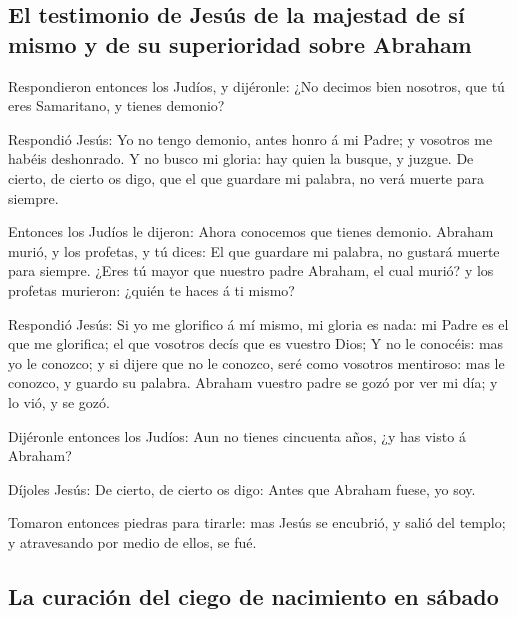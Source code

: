 \hypertarget{el-testimonio-de-jesuxfas-de-la-majestad-de-suxed-mismo-y-de-su-superioridad-sobre-abraham}{%
\subsection{El testimonio de Jesús de la majestad de sí mismo y de su
superioridad sobre
Abraham}\label{el-testimonio-de-jesuxfas-de-la-majestad-de-suxed-mismo-y-de-su-superioridad-sobre-abraham}}

 Respondieron entonces los Judíos, y dijéronle: ¿No
decimos bien nosotros, que tú eres Samaritano, y tienes demonio?

 Respondió Jesús: Yo no tengo demonio, antes honro á mi
Padre; y vosotros me habéis deshonrado.  Y no busco mi
gloria: hay quien la busque, y juzgue.  De cierto, de
cierto os digo, que el que guardare mi palabra, no verá muerte para
siempre.

 Entonces los Judíos le dijeron: Ahora conocemos que
tienes demonio. Abraham murió, y los profetas, y tú dices: El que
guardare mi palabra, no gustará muerte para siempre. 
¿Eres tú mayor que nuestro padre Abraham, el cual murió? y los profetas
murieron: ¿quién te haces á ti mismo?

 Respondió Jesús: Si yo me glorifico á mí mismo, mi
gloria es nada: mi Padre es el que me glorifica; el que vosotros decís
que es vuestro Dios;  Y no le conocéis: mas yo le
conozco; y si dijere que no le conozco, seré como vosotros mentiroso:
mas le conozco, y guardo su palabra.  Abraham vuestro
padre se gozó por ver mi día; y lo vió, y se gozó.

 Dijéronle entonces los Judíos: Aun no tienes cincuenta
años, ¿y has visto á Abraham?

 Díjoles Jesús: De cierto, de cierto os digo: Antes que
Abraham fuese, yo soy.

 Tomaron entonces piedras para tirarle: mas Jesús se
encubrió, y salió del templo; y atravesando por medio de ellos, se fué.

\hypertarget{la-curaciuxf3n-del-ciego-de-nacimiento-en-suxe1bado}{%
\subsection{La curación del ciego de nacimiento en
sábado}\label{la-curaciuxf3n-del-ciego-de-nacimiento-en-suxe1bado}}

